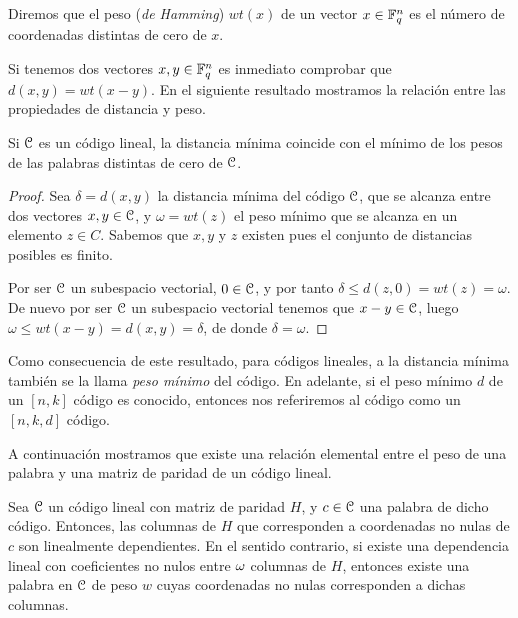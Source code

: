 \begin{definition}
Diremos que el peso (\textit{de Hamming}) \(wt(x)\) de un vector \(x \in \mathbb{F}_q^n\) es el número de coordenadas distintas de cero de \(x\).
\end{definition}

Si tenemos dos vectores \(x, y \in \mathbb{F}_q^n\) es inmediato comprobar que \(d(x,y) = wt(x - y)\). En el siguiente resultado mostramos la relación entre las propiedades de distancia y peso.

\begin{proposition}
Si \(\mathcal{C}\) es un  código lineal, la distancia mínima coincide con el mínimo de los pesos de las palabras distintas de cero de \(\mathcal{C}\).

\begin{proof}
Sea \(\delta = d(x,y)\) la distancia mínima del código \(\mathcal{C}\), que se alcanza entre dos vectores \(x, y \in \mathcal{C}\), y \(\omega = wt(z)\) el peso mínimo que se alcanza en un elemento \(z \in C\). Sabemos que \(x, y \) y \(z\) existen pues el conjunto de distancias posibles es finito.

Por ser \(\mathcal{C}\) un subespacio vectorial,  \(0 \in \mathcal{C}\), y por tanto  \(\delta \leq d(z, 0) = wt(z) = \omega\). De nuevo por ser \(\mathcal{C}\) un subespacio vectorial tenemos que \(x-y \in \mathcal{C}\), luego \(\omega \leq wt(x-y) = d(x,y) = \delta\), de donde \(\delta = \omega\).
\end{proof}
\end{proposition}

Como consecuencia de este resultado, para códigos lineales, a la distancia mínima también se la llama \textit{peso mínimo} del código. En adelante, si el peso mínimo \(d\) de un \([n,k]\) código es conocido, entonces nos referiremos al código como un \([n,k,d]\) código.

A continuación mostramos que existe una relación elemental entre el peso de una palabra y una matriz de paridad de un código lineal.

\begin{proposition}
    Sea \(\mathcal{C}\) un código lineal con matriz de paridad \(H\), y \(c \in \mathcal{C}\) una palabra de dicho código. Entonces, las columnas de \(H\) que corresponden a coordenadas no nulas de \(c\) son linealmente dependientes. En el sentido contrario, si existe una dependencia lineal con coeficientes no nulos entre \(\omega\) columnas de  \(H\), entonces existe una palabra en \(\mathcal{C}\) de peso \(w\) cuyas coordenadas no nulas corresponden a dichas columnas.
\end{proposition}

